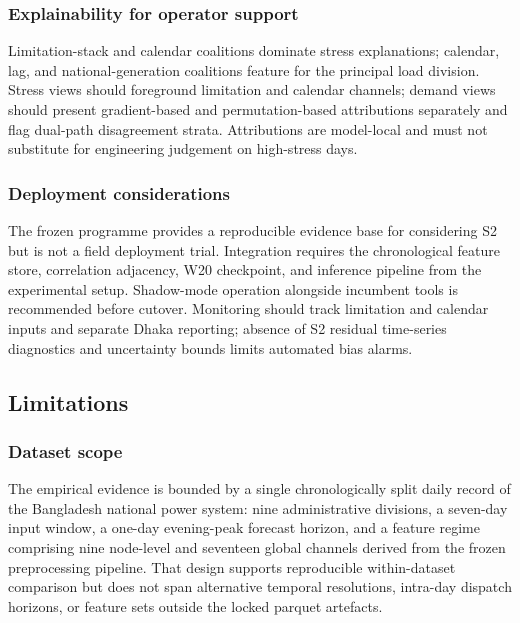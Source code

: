 \subsubsection{Explainability for operator support}\label{subsubsection:explainability_for_operator_support}

Limitation-stack and calendar coalitions dominate stress explanations; calendar, lag, and national-generation coalitions feature for the principal load division. Stress views should foreground limitation and calendar channels; demand views should present gradient-based and permutation-based attributions separately and flag dual-path disagreement strata. Attributions are model-local and must not substitute for engineering judgement on high-stress days.

\subsubsection{Deployment considerations}\label{subsubsection:deployment_considerations}

The frozen programme provides a reproducible evidence base for considering S2 but is not a field deployment trial. Integration requires the chronological feature store, correlation adjacency, W20 checkpoint, and inference pipeline from the experimental setup. Shadow-mode operation alongside incumbent tools is recommended before cutover. Monitoring should track limitation and calendar inputs and separate Dhaka reporting; absence of S2 residual time-series diagnostics and uncertainty bounds limits automated bias alarms.

\subsection{Limitations}\label{subsection:limitations}

\subsubsection{Dataset scope}\label{subsubsection:dataset_scope}

The empirical evidence is bounded by a single chronologically split daily record of the Bangladesh national power system: nine administrative divisions, a seven-day input window, a one-day evening-peak forecast horizon, and a feature regime comprising nine node-level and seventeen global channels derived from the frozen preprocessing pipeline. That design supports reproducible within-dataset comparison but does not span alternative temporal resolutions, intra-day dispatch horizons, or feature sets outside the locked parquet artefacts.

